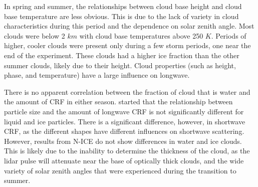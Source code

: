 In spring and summer, the relationships between cloud base height and cloud base temperature are less obvious. This is due to the lack of variety in cloud characteristics during this period and the dependence on solar zenith angle. Most clouds were below 2 $km$ with cloud base temperatures above 250 $K$. Periods of higher, cooler clouds were present only during a few storm periods, one near the end of the experiment. These clouds had a higher ice fraction than the other summer clouds, likely due to their height. Cloud properties (such as height, phase, and temperature) have a large influence on longwave.

There is no apparent correlation between the fraction of cloud that is water and the amount of CRF in either season. \citet{schweiger:1999} started that the relationship between particle size and the amount of longwave CRF is not significantly different for liquid and ice particles. There is a significant difference, however, in shortwave CRF, as the different shapes have different influences on shortwave scattering. However, results from N-ICE do not show differences in water and ice clouds. This is likely due to the inability to determine the thickness of the cloud, as the lidar pulse will attenuate near the base of optically thick clouds, and the wide variety of solar zenith angles that were experienced during the transition to summer. 

